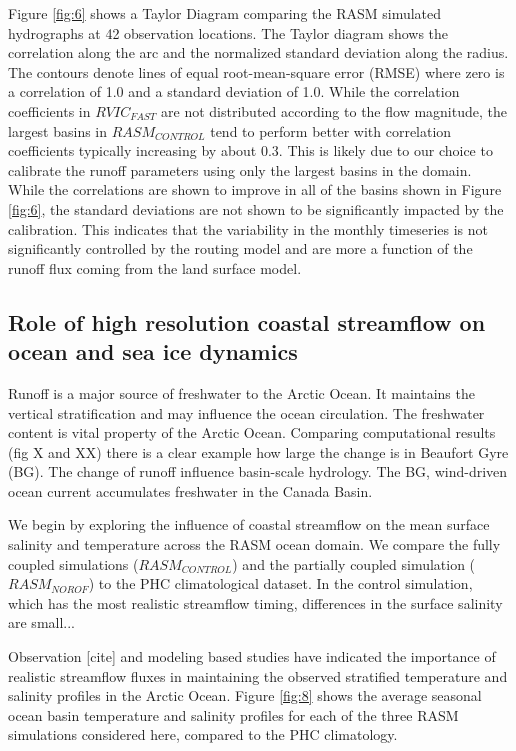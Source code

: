 \documentclass[jgrga, draft]{agutex}
\begin{document}
\begin{article}
Figure \ref{fig:6} shows a Taylor Diagram comparing the RASM simulated hydrographs at 42 observation locations.
The Taylor diagram shows the correlation along the arc and the normalized standard deviation along the radius.
The contours denote lines of equal root-mean-square error (RMSE) where zero is a correlation of 1.0 and a standard deviation of 1.0.
While the correlation coefficients in $RVIC_{FAST}$ are not distributed according to the flow magnitude, the largest basins in $RASM_{CONTROL}$ tend to perform better with correlation coefficients typically increasing by about 0.3.
This is likely due to our choice to calibrate the runoff parameters using only the largest basins in the domain.
While the correlations are shown to improve in all of the basins shown in Figure \ref{fig:6}, the standard deviations are not shown to be significantly impacted by the calibration.
This indicates that the variability in the monthly timeseries is not significantly controlled by the routing model and are more a function of the runoff flux coming from the land surface model.

\subsection{Role of high resolution coastal streamflow on ocean and sea ice dynamics}
Runoff is a major source of freshwater to the Arctic Ocean. It maintains the vertical stratification and may influence the ocean circulation.
The freshwater content is vital property of the Arctic Ocean.
Comparing computational results (fig X and XX) there is a clear example how large the change is in Beaufort Gyre (BG).
The change of runoff influence basin-scale hydrology.
The BG, wind-driven ocean current accumulates freshwater in the Canada Basin.

We begin by exploring the influence of coastal streamflow on the mean surface salinity and temperature across the RASM ocean domain.
We compare the fully coupled simulations ($RASM_{CONTROL}$) and the partially coupled simulation ($RASM_{NOROF}$) to the PHC climatological dataset.
In the control simulation, which has the most realistic streamflow timing, differences in the surface salinity are small...

Observation [cite] and modeling \citep[e.g.][]{Nummelin_2015} based studies have indicated the importance of realistic streamflow fluxes in maintaining the observed stratified temperature and salinity profiles in the Arctic Ocean.
Figure \ref{fig:8} shows the average seasonal ocean basin temperature and salinity profiles for each of the three RASM simulations considered here, compared to the PHC climatology.


\end{article}
\end{document}
